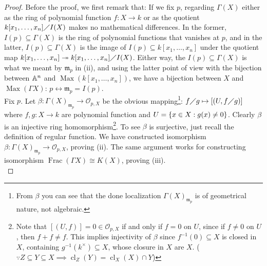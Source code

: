 \documentclass{report}
\begin{document}
\begin{proof}
Before the proof, we first remark that: If we fix $p$, regarding $\Gamma (X)$ either as the ring of polynomial function $f:X\rightarrow  k$ or as the quotient  $k[x_1,\dots ,x_n]\diagup I(X)$ makes no mathematical differences. In the former, $I(p)\subseteq \Gamma (X)$ is the ring of polynomial functions that vanishes at $p$, and in the latter,  $I(p)\subseteq \Gamma (X)$ is the image of $I(p)\subseteq k[x_1,\dots ,x_n]$  under the quotient map $k[x_1,\dots ,x_n] \twoheadrightarrow k[x_1,\dots ,x_n]\diagup I(X)$. Either way, the  $I(p)\subseteq \Gamma (X)$ is what we meant by $\mathfrak{m}_p$ in (ii), and using the latter point of view with the bijection between $\mathbb{A}^n$ and $\operatorname{Max}(k[x_1,\dots,x_n])$, we have a bijection between $X$ and $\operatorname{Max}(\Gamma X)$: $p\leftrightarrow \mathfrak{m}_p=I(p)$. \\


Fix $p$. Let $\beta  :\Gamma (X)_{\mathfrak{m}_p}\rightarrow \mathscr{O}_{p,X}$ be the obvious mapping\footnote{From $\beta $ you can see that the done localization $\Gamma (X)_{\mathfrak{m}_p}$ is of geometrical nature, not algebraic.}: $f\diagup g\mapsto [(U,f\diagup g)]$ where $f,g:X\rightarrow k$ are polynomial function and $U=\{ x \in X:g(x)\neq 0 \}$. Clearly $\beta $ is an injective ring homomorphism\footnote{Note that $[(U,f)]=0 \in \mathscr{O}_{p,X}$ if and only if $f=0$ on  $U$, since if $f\neq 0$ on $U$, then  $f+f\neq f$. This implies injectivity of $\beta $ since $f^{-1}(0)\subseteq X$ is closed in $X$, containing  $g^{-1}(k^\times) \subseteq X$, whose closure in $X$ are  $X$.  ($\because Z \subseteq Y \subseteq X \implies \operatorname{cl}_Z(Y)=\operatorname{cl}_X(X)\cap Y$) }. To see $\beta $ is surjective, just recall the definition of regular function. We have constructed isomorphism  $\beta :\Gamma (X)_{\mathfrak{m}_p}\rightarrow \mathscr{O}_{p,X}$, proving (ii). The same argument works for constructing isomorphism $\operatorname{Frac}(\Gamma X)\cong  K(X)$, proving (iii).\\


\end{proof}
\end{document}

